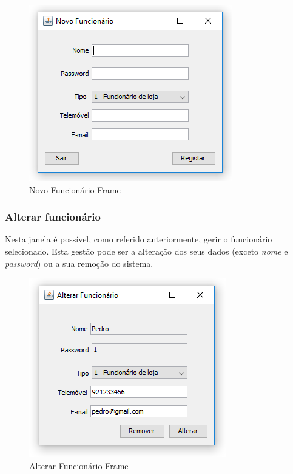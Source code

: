 \documentclass[11pt]{article} %
\begin{document}
\begin{figure}[H]
	\centering
	\includegraphics[]{novofuncframe.png}
	\caption{Novo Funcionário Frame}
	\label{novofuncframe}
\end{figure}


\subsubsection{Alterar funcionário}
\label{alterafunc}

Nesta janela é possível, como referido anteriormente, gerir o funcionário selecionado. Esta gestão pode ser a alteração dos seus dados (exceto \textit{nome} e \textit{password}) ou a sua remoção do sistema.

\begin{figure}[H]
	\centering
	\includegraphics[]{alterarfuncframe.png}
	\caption{Alterar Funcionário Frame}
	\label{alterarfuncframe}
\end{figure}
\end{document}
